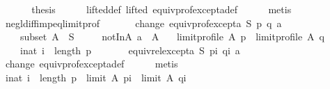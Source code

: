 \begin{isabellebody}
\isanewline
\ \ \isamarkupfalse%
\isanewline
\ \ \isamarkupfalse%
\ {\isacharquery}{\kern0pt}thesis\isanewline
\ \ \ \ \isamarkupfalse%
\ lifted{\isacharunderscore}{\kern0pt}def\ lifted\ equiv{\isacharunderscore}{\kern0pt}prof{\isacharunderscore}{\kern0pt}except{\isacharunderscore}{\kern0pt}a{\isacharunderscore}{\kern0pt}def\isanewline
\ \ \ \ \isamarkupfalse%
\ metis\isanewline
{}\isamarkupfalse%
%
\endisatagproof
{\isafoldproof}%
%
\isadelimproof
\isanewline
%
\endisadelimproof
\isanewline
{}\isamarkupfalse%
\ negl{\isacharunderscore}{\kern0pt}diff{\isacharunderscore}{\kern0pt}imp{\isacharunderscore}{\kern0pt}eq{\isacharunderscore}{\kern0pt}limit{\isacharunderscore}{\kern0pt}prof{\isacharcolon}{\kern0pt}\isanewline
\ \ \isanewline
\ \ \ \ change{\isacharcolon}{\kern0pt}\ {\isachardoublequoteopen}equiv{\isacharunderscore}{\kern0pt}prof{\isacharunderscore}{\kern0pt}except{\isacharunderscore}{\kern0pt}a\ S\ p\ q\ a{\isachardoublequoteclose}\ \isanewline
\ \ \ \ subset{\isacharcolon}{\kern0pt}\ {\isachardoublequoteopen}A\ {\isasymsubseteq}\ S{\isachardoublequoteclose}\ \isanewline
\ \ \ \ notInA{\isacharcolon}{\kern0pt}\ {\isachardoublequoteopen}a\ {\isasymnotin}\ A{\isachardoublequoteclose}\isanewline
\ \ \ {\isachardoublequoteopen}limit{\isacharunderscore}{\kern0pt}profile\ A\ p\ {\isacharequal}{\kern0pt}\ limit{\isacharunderscore}{\kern0pt}profile\ A\ q{\isachardoublequoteclose}\isanewline
%
\isadelimproof
%
\endisadelimproof
%
\isatagproof
{}\isamarkupfalse%
\ {\isacharminus}{\kern0pt}\isanewline
\ \ \isamarkupfalse%
\isanewline
\ \ \ \ {\isachardoublequoteopen}{\isasymforall}i{\isacharcolon}{\kern0pt}{\isacharcolon}{\kern0pt}nat{\isachardot}{\kern0pt}\ i\ {\isacharless}{\kern0pt}\ length\ p\ {\isasymlongrightarrow}\isanewline
\ \ \ \ \ \ equiv{\isacharunderscore}{\kern0pt}rel{\isacharunderscore}{\kern0pt}except{\isacharunderscore}{\kern0pt}a\ S\ {\isacharparenleft}{\kern0pt}p{\isacharbang}{\kern0pt}i{\isacharparenright}{\kern0pt}\ {\isacharparenleft}{\kern0pt}q{\isacharbang}{\kern0pt}i{\isacharparenright}{\kern0pt}\ a{\isachardoublequoteclose}\isanewline
\ \ \ \ \isamarkupfalse%
\ change\ equiv{\isacharunderscore}{\kern0pt}prof{\isacharunderscore}{\kern0pt}except{\isacharunderscore}{\kern0pt}a{\isacharunderscore}{\kern0pt}def\isanewline
\ \ \ \ \isamarkupfalse%
\ metis\isanewline
\ \ \isamarkupfalse%
\ {\isachardoublequoteopen}{\isasymforall}i{\isacharcolon}{\kern0pt}{\isacharcolon}{\kern0pt}nat{\isachardot}{\kern0pt}\ i\ {\isacharless}{\kern0pt}\ length\ p\ {\isasymlongrightarrow}\ limit\ A\ {\isacharparenleft}{\kern0pt}p{\isacharbang}{\kern0pt}i{\isacharparenright}{\kern0pt}\ {\isacharequal}{\kern0pt}\ limit\ A\ {\isacharparenleft}{\kern0pt}q{\isacharbang}{\kern0pt}i{\isacharparenright}{\kern0pt}{\isachardoublequoteclose}\isanewline

\end{isabellebody}
